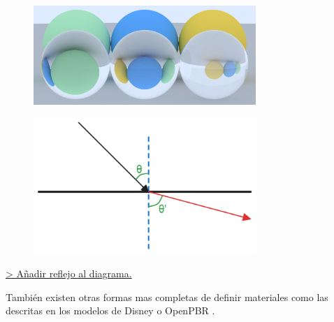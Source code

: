 \documentclass[10pt, a4paper]{article}
\begin{document}
\begin{figure}[h]
     \centering 
    \includegraphics[width=0.75\textwidth]{04_crop}

\end{figure}

    \caption{Render de tres bolas con un material dieléctrico y tres esferas de distintos colores, sobre una superficie gris. Los indices de refracción de las tres bolas son: 1.3 (agua, izquierda), 1.5 (cristal, centro) y 2.4 (diamante, derecha).}

\begin{figure}[h]
     \centering 
    \includegraphics[width=0.75\textwidth]{dielectric}

\end{figure}

    \caption{Diagrama de la refracción de un rayo de luz al atravesar la superficie de un material dieléctrico. Rayo de incidencia en negro, rayo refractado en rojo.}

\underline{> Añadir reflejo al diagrama.}

También existen otras formas mas completas de definir materiales como las descritas en los modelos de Disney \cite{Burley:2012} o OpenPBR \cite{Academy-Software-Foundation:2024}.
\end{document}
